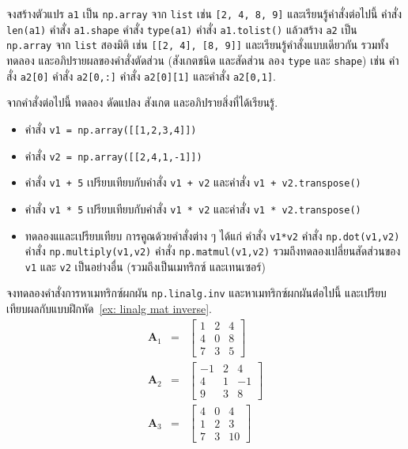 \begin{Exercise}
	\label{ex: numpy np.array}
	จงสร้างตัวแปร \texttt{a1} เป็น \texttt{np.array} จาก \texttt{list} เช่น \verb|[2, 4, 8, 9]|
	และเรียนรู้คำสั่งต่อไปนี้
	คำสั่ง \texttt{len(a1)}
	คำสั่ง \texttt{a1.shape}
	คำสั่ง \texttt{type(a1)}
	คำสั่ง \texttt{a1.tolist()}
	แล้วสร้าง
	\texttt{a2} เป็น \texttt{np.array} จาก \texttt{list} สองมิติ 
	เช่น \verb|[[2, 4], [8, 9]]|
	และเรียนรู้คำสั่งแบบเดียวกัน รวมทั้งทดลอง
	และอภิปรายผลของคำสั่งตัดส่วน
	(สังเกตชนิด และสัดส่วน ลอง \texttt{type} และ \texttt{shape})
	เช่น
	คำสั่ง \verb|a2[0]|
	คำสั่ง \verb|a2[0,:]|
	คำสั่ง \verb|a2[0][1]|
	และคำสั่ง \verb|a2[0,1]|.
	
\end{Exercise}

\begin{Exercise}
	\label{ex: numpy addition}
	จากคำสั่งต่อไปนี้ ทดลอง
	ดัดแปลง สังเกต และอภิปรายสิ่งที่ได้เรียนรู้.
	\begin{itemize}
		\item คำสั่ง 
		\verb|v1 = np.array([[1,2,3,4]])|
		\item คำสั่ง
		\verb|v2 = np.array([[2,4,1,-1]])|
		\item คำสั่ง
		\verb|v1 + 5|
		เปรียบเทียบกับคำสั่ง
		\verb|v1 + v2|
		และคำสั่ง
		\verb|v1 + v2.transpose()|
		\item คำสั่ง
		\verb|v1 * 5|
เปรียบเทียบกับคำสั่ง
\verb|v1 * v2|
และคำสั่ง
\verb|v1 * v2.transpose()|
		\item ทดลองแและเปรียบเทียบ
		การคูณด้วยคำสั่งต่าง ๆ 
		ได้แก่
		คำสั่ง \verb|v1*v2|
		คำสั่ง \verb|np.dot(v1,v2)|
		คำสั่ง \verb|np.multiply(v1,v2)|
		คำสั่ง	
		\verb|np.matmul(v1,v2)|
		รวมถึงทดลองเปลี่ยนสัดส่วนของ \verb|v1| และ \verb|v2| เป็นอย่างอื่น (รวมถึงเป็นเมทริกซ์ และเทนเซอร์)	
		
	\end{itemize}	
\end{Exercise}

\begin{Exercise}
	\label{ex: numpy inverse}
	จงทดลองคำสั่งการหาเมทริกซ์ผกผัน \verb|np.linalg.inv|
	และหาเมทริกซ์ผกผันต่่อไปนี้
	และเปรียบเทียบผลกับแบบฝึกหัด~\ref{ex: linalg mat inverse}.
	\begin{eqnarray}
	\bm{A}_1 &=& \begin{bmatrix}
	1 & 2 & 4 \\
	4 & 0 & 8 \\
	7 & 3 & 5
	\end{bmatrix}
	\nonumber \\
	\bm{A}_2 &=& \begin{bmatrix}
	-1 & 2 & 4 \\
	4 & 1 & -1 \\
	9 & 3 & 8
	\end{bmatrix}
	\nonumber \\
	\bm{A}_3 &=& \begin{bmatrix}
	4 & 0 & 4 \\
	1 & 2 & 3 \\
	7 & 3 & 10
	\end{bmatrix}
	\nonumber	
	\end{eqnarray}
	
	
\end{Exercise}

